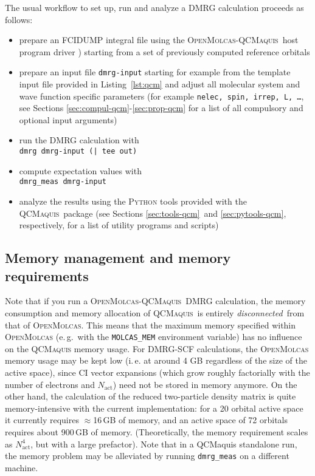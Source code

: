 \documentclass[bibliography=totoc,12pt,a4paper]{scrartcl}
\newcommand{\mol}{\textsc{OpenMolcas}}
\newcommand{\qcm}{\textsc{QCMaquis}}
\begin{document}
The usual workflow to set up, run and analyze a DMRG calculation proceeds as follows:

\begin{itemize}
   \item prepare an FCIDUMP integral file using the \mol-\qcm\ host
   program driver \cite{interface}) starting from a set of previously computed reference orbitals
   \item prepare an input file \texttt{dmrg-input} starting for example from the template input file provided in Listing~\ref{lst:qcm} and adjust all molecular system and wave function specific parameters (for example \texttt{nelec, spin,
   irrep, L, \ldots}, see Sections \ref{sec:compul-qcm}-\ref{sec:prop-qcm} for a list of all compulsory and optional input arguments)
   \item run the DMRG calculation with\\
\texttt{dmrg dmrg-input (| tee out)}
   \item compute expectation values with\\
\texttt{dmrg\_meas dmrg-input}
   \item analyze the results using the \textsc{Python} tools provided with the \qcm\ package (see Sections \ref{sec:tools-qcm}\ and
   \ref{sec:pytools-qcm}, respectively, for a list of utility programs and scripts)
\end{itemize}

\subsection{Memory management and memory requirements}\label{sec:memory-qcm}

Note that if you run a \mol-\qcm\ DMRG calculation, the memory consumption and memory allocation
of \qcm\ is entirely \emph{disconnected}\ from that of \mol. This means that the maximum memory specified within \mol{} (e.\,g.\ with the \texttt{MOLCAS\_MEM} environment variable) has no influence on the \qcm{} memory usage. For DMRG-SCF calculations, the \mol{} memory usage may be kept low (i.\,e. at around 4 GB regardless of the size of the active space), since CI vector expansions (which grow roughly factorially with the number of electrons and $N_\text{act}$) need not be stored in memory anymore. On the other hand, the calculation of the reduced two-particle density matrix is quite memory-intensive with the current implementation: for a 20 orbital active space it currently requires $\approx$16\,GB of memory, and an active space of 72 orbitals requires about 900\,GB of memory. (Theoretically, the memory requirement scales as $N_\text{act}^4$, but with a large prefactor). Note that in a QCMaquis standalone run, the memory problem may be alleviated by running \texttt{dmrg\_meas} on a different machine.
\end{document}
